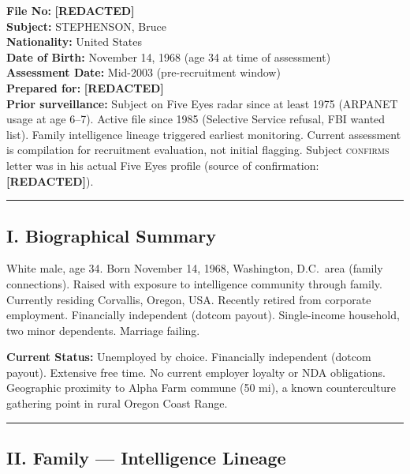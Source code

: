 \vspace{0.5cm}

\noindent\textbf{File No:} \textbf{[REDACTED]}\\
\textbf{Subject:} STEPHENSON, Bruce\\
\textbf{Nationality:} United States\\
\textbf{Date of Birth:} November 14, 1968 (age 34 at time of assessment)\\
\textbf{Assessment Date:} Mid-2003 (pre-recruitment window)\\
\textbf{Prepared for:} \textbf{[REDACTED]}\\
\textbf{Prior surveillance:} Subject on Five Eyes radar since at least 1975 (ARPANET usage at age 6--7). Active file since 1985 (Selective Service refusal, FBI wanted list). Family intelligence lineage triggered earliest monitoring. Current assessment is compilation for recruitment evaluation, not initial flagging. Subject \textsc{confirms} letter was in his actual Five Eyes profile (source of confirmation: \textbf{[REDACTED]}).

\vspace{1cm}\hrule\vspace{1cm}

\subsection*{I. Biographical Summary}
\label{interlude:biographical-summary}

White male, age 34. Born November 14, 1968, Washington, D.C.\ area (family connections). Raised with exposure to intelligence community through family. Currently residing Corvallis, Oregon, USA. Recently retired from corporate employment. Financially independent (dotcom payout). Single-income household, two minor dependents. Marriage failing.

\textbf{Current Status:} Unemployed by choice. Financially independent (dotcom payout). Extensive free time. No current employer loyalty or NDA obligations. Geographic proximity to Alpha Farm commune (50 mi), a known counterculture gathering point in rural Oregon Coast Range.

\vspace{1cm}\hrule\vspace{1cm}

\subsection*{II. Family --- Intelligence Lineage}
\label{interlude:family-intelligence-lineage}

